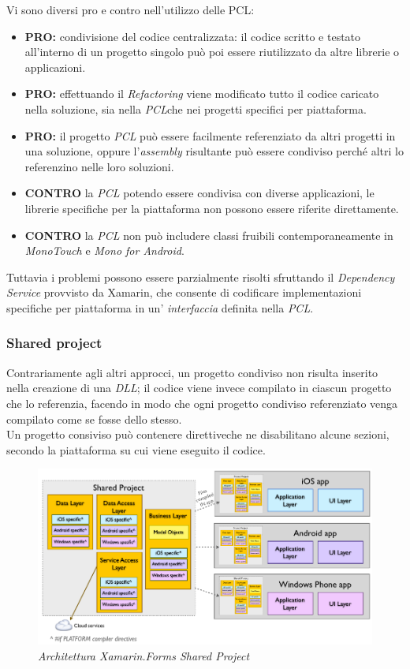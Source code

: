 Vi sono diversi pro e contro nell'utilizzo delle PCL:
\begin{itemize}
	\item \textbf{PRO:} condivisione del codice centralizzata: il codice scritto e testato all'interno di un progetto singolo può poi essere riutilizzato da altre librerie o applicazioni.
	\item \textbf{PRO:} effettuando il \textit{Refactoring} viene modificato tutto il codice caricato nella soluzione, sia nella \textit{PCL}che nei progetti specifici per piattaforma.
	\item \textbf{PRO:} il progetto \textit{PCL} può essere facilmente referenziato da altri progetti in una soluzione, oppure l'\textit{assembly} risultante può essere condiviso perché altri lo referenzino nelle loro soluzioni.
	\item \textbf{CONTRO} la \textit{PCL} potendo essere condivisa con diverse applicazioni, le librerie specifiche per la piattaforma non possono essere riferite direttamente.
	\item \textbf{CONTRO} la \textit{PCL} non può includere classi fruibili contemporaneamente in \textit{MonoTouch} e \textit{Mono for Android}. 
\end{itemize}
Tuttavia i problemi possono essere parzialmente risolti sfruttando il \textit{Dependency Service} provvisto da Xamarin, che consente di codificare implementazioni specifiche per piattaforma in un' \textit{interfaccia} definita nella \textit{PCL}.
\subsubsection{Shared project}
Contrariamente agli altri approcci, un progetto condiviso non risulta inserito nella creazione di una \textit{DLL}; il codice viene invece compilato in ciascun progetto che lo referenzia, facendo in modo che ogni progetto condiviso referenziato venga compilato come se fosse dello stesso.
\\
Un progetto consiviso può contenere direttiveche ne disabilitano alcune sezioni, secondo la piattaforma su cui viene eseguito il codice.

\begin{figure}[ht]
	\centering
	\includegraphics[scale=0.30]{immagini/progettazione/SharedAssetProject.png}
	\caption{\textit{Architettura Xamarin.Forms Shared Project}}
\end{figure}\FloatBarrier

